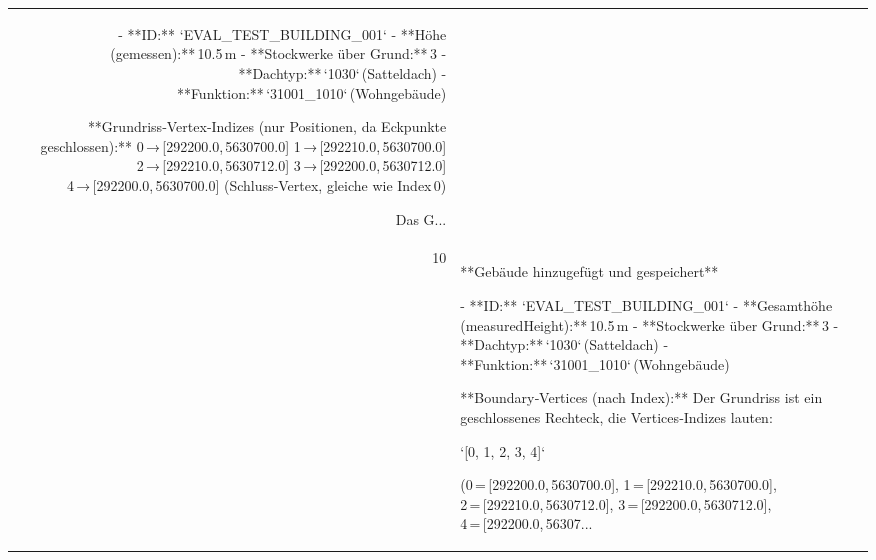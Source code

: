\documentclass[a4paper,11pt]{article}
\begin{document}
\begin{table}[ht]
\begin{tabular}{r p{12cm}}
- **ID:** `EVAL\_TEST\_BUILDING\_001`  
- **Höhe (gemessen):** 10.5 m  
- **Stockwerke über Grund:** 3  
- **Dachtyp:** `1030` (Satteldach)  
- **Funktion:** `31001\_1010` (Wohngebäude)  

**Grundriss‑Vertex‑Indizes (nur Positionen, da Eckpunkte geschlossen):**  
0 → [292200.0, 5630700.0]  
1 → [292210.0, 5630700.0]  
2 → [292210.0, 5630712.0]  
3 → [292200.0, 5630712.0]  
4 → [292200.0, 5630700.0] (Schluss‑Vertex, gleiche wie Index 0)  

Das G... \\
10 & **Gebäude hinzugefügt und gespeichert**

- **ID:** `EVAL\_TEST\_BUILDING\_001`  
- **Gesamthöhe (measuredHeight):** 10.5 m  
- **Stockwerke über Grund:** 3  
- **Dachtyp:** `1030` (Satteldach)  
- **Funktion:** `31001\_1010` (Wohngebäude)  

**Boundary‑Vertices (nach Index):**  
Der Grundriss ist ein geschlossenes Rechteck, die Vertices‑Indizes lauten:

`[0, 1, 2, 3, 4]`

(0 = [292200.0, 5630700.0], 1 = [292210.0, 5630700.0], 2 = [292210.0, 5630712.0], 3 = [292200.0, 5630712.0], 4 = [292200.0, 56307... \\
\hline
\end{tabular}
\end{table}

\clearpage
\end{document}
